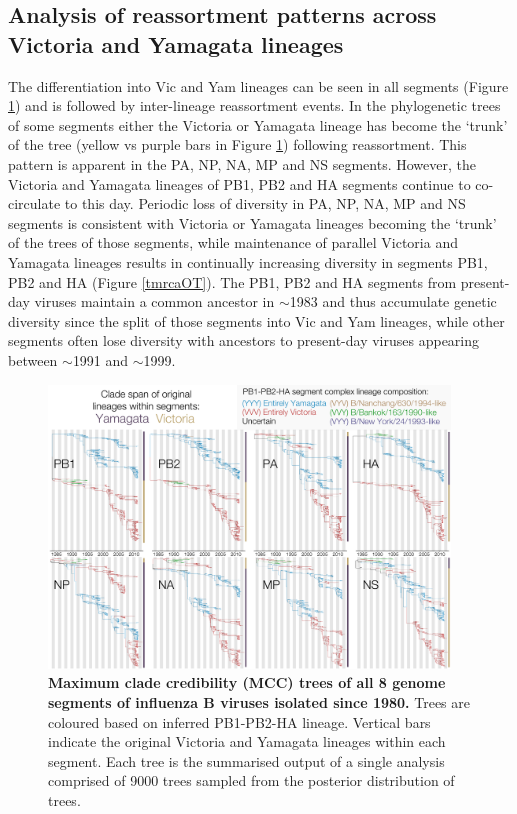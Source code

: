 \documentclass[11pt,oneside,letterpaper]{article}
\begin{document}
\subsection*{Analysis of reassortment patterns across Victoria and Yamagata lineages}
The differentiation into Vic and Yam lineages can be seen in all segments (Figure \ref{genomeGrid}) and is followed by inter-lineage reassortment events.
In the phylogenetic trees of some segments either the Victoria or Yamagata lineage has become the `trunk' of the tree (yellow vs purple bars in Figure \ref{genomeGrid}) following reassortment.
This pattern is apparent in the PA, NP, NA, MP and NS segments.
However, the Victoria and Yamagata lineages of PB1, PB2 and HA segments continue to co-circulate to this day.
Periodic loss of diversity in PA, NP, NA, MP and NS segments is consistent with Victoria or Yamagata lineages becoming the `trunk' of the trees of those segments, while maintenance of parallel Victoria and Yamagata lineages results in continually increasing diversity in segments PB1, PB2 and HA (Figure \ref{tmrcaOT}).
The PB1, PB2 and HA segments from present-day viruses maintain a common ancestor in $\sim$1983 and thus accumulate genetic diversity since the split of those segments into Vic and Yam lineages, while other segments often lose diversity with ancestors to present-day viruses appearing between $\sim$1991 and $\sim$1999.

\begin{figure}[h]
\centering
\includegraphics[width=0.95\textwidth]{figures/InfB_genomeGrid.pdf}
\caption{\textbf{Maximum clade credibility (MCC) trees of all 8 genome segments of influenza B viruses isolated since 1980.}
Trees are coloured based on inferred PB1-PB2-HA lineage.
Vertical bars indicate the original Victoria and Yamagata lineages within each segment.
Each tree is the summarised output of a single analysis comprised of 9000 trees sampled from the posterior distribution of trees.}
\label{genomeGrid}
\end{figure}
\end{document}
